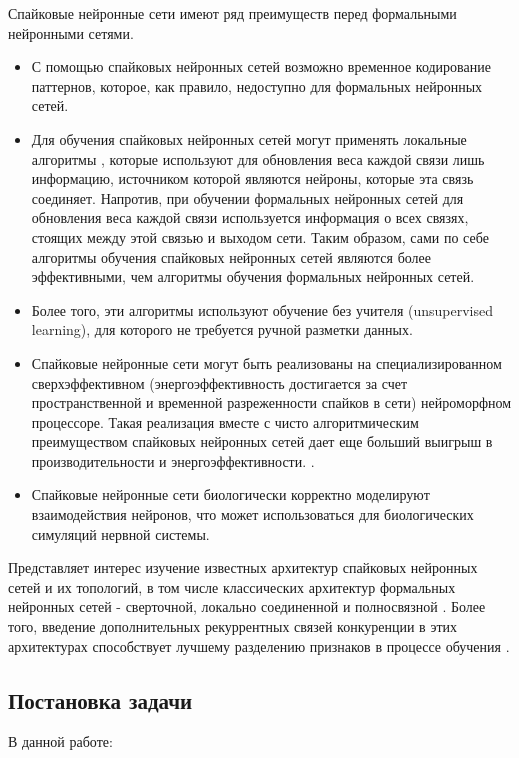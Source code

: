 \documentclass[a4paper]{article}
\begin{document}
Спайковые нейронные сети имеют ряд преимуществ перед формальными нейронными сетями.

\begin{itemize}
\item С помощью спайковых нейронных сетей возможно временное кодирование паттернов, которое, как правило, недоступно для формальных нейронных сетей.
\item Для обучения спайковых нейронных сетей могут применять локальные алгоритмы \cite{STDP, pehlevan2019spiking, Baldi_2016}, которые используют для обновления веса каждой связи лишь информацию, источником которой являются нейроны, которые эта связь соединяет. Напротив, при обучении формальных нейронных сетей для обновления веса каждой связи используется информация о всех связях, стоящих между этой связью и выходом сети. Таким образом, сами по себе алгоритмы обучения спайковых нейронных сетей являются более эффективными, чем алгоритмы обучения формальных нейронных сетей.
\item Более того, эти алгоритмы используют обучение без учителя (unsupervised learning), для которого не требуется ручной разметки данных.
\item Спайковые нейронные сети могут быть реализованы на специализированном сверхэффективном (энергоэффективность достигается за счет пространственной и временной разреженности спайков в сети) нейроморфном процессоре. Такая реализация вместе с чисто алгоритмическим преимуществом спайковых нейронных сетей дает еще больший выигрыш в производительности и энергоэффективности. \cite{hardware1, hardware2}. 
\item Спайковые нейронные сети биологически корректно моделируют взаимодействия нейронов, что может использоваться для биологических симуляций нервной системы.
\end{itemize}

Представляет интерес изучение известных архитектур спайковых нейронных сетей и их топологий, в том числе классических архитектур формальных нейронных сетей - сверточной, локально соединенной и полносвязной \cite{Khan_2020}. Более того, введение дополнительных рекуррентных связей конкуренции в этих архитектурах способствует лучшему разделению признаков в  процессе обучения \cite{MaxActiv1, MaxActiv2}.
 
\subsection*{Постановка задачи}
В данной работе:
\end{document}
